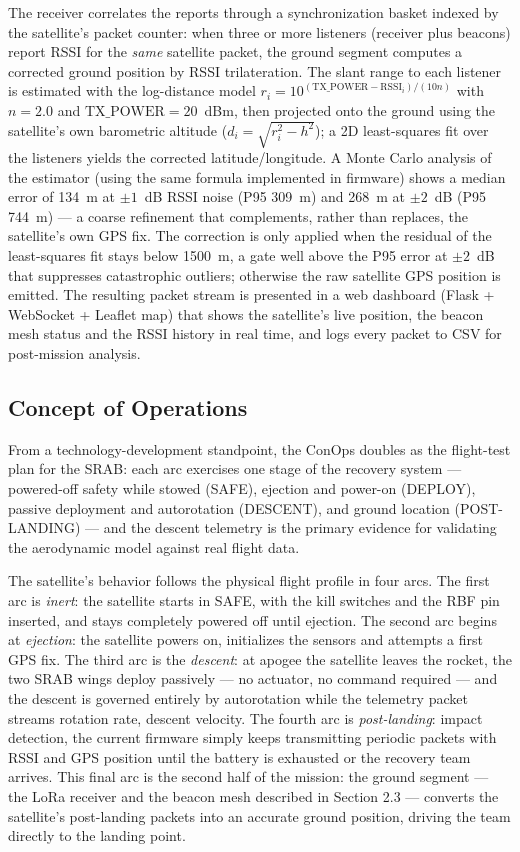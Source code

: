 The receiver correlates the reports through a synchronization basket
indexed by the satellite's packet counter: when three or more
listeners (receiver plus beacons) report RSSI for the \emph{same}
satellite packet, the ground segment computes a corrected ground
position by RSSI trilateration. The slant range to each listener is
estimated with the log-distance model
$r_i = 10^{(\mathrm{TX\_POWER} - \mathrm{RSSI}_i)/(10 n)}$ with
$n = 2.0$ and $\mathrm{TX\_POWER} = 20$~dBm, then projected onto the
ground using the satellite's own barometric altitude
($d_i = \sqrt{r_i^2 - h^2}$); a 2D least-squares fit over the
listeners yields the corrected latitude/longitude. A Monte Carlo
analysis of the estimator (using the same formula implemented in
firmware) shows a median error of 134~m at $\pm1$~dB RSSI noise (P95
309~m) and 268~m at $\pm2$~dB (P95 744~m) --- a coarse refinement
that complements, rather than replaces, the satellite's own GPS fix.
The correction is only applied when the residual of the least-squares
fit stays below 1500~m, a gate well above the P95 error at $\pm2$~dB
that suppresses catastrophic outliers; otherwise the raw satellite GPS
position is emitted. The resulting packet stream is presented in a web
dashboard (Flask + WebSocket + Leaflet map) that shows the satellite's
live position, the beacon mesh status and the RSSI history in real
time, and logs every packet to CSV for post-mission analysis.

\subsection{Concept of Operations}

From a technology-development standpoint, the ConOps doubles as the
flight-test plan for the SRAB: each arc exercises one stage of the
recovery system --- powered-off safety while stowed (SAFE), ejection
and power-on (DEPLOY), passive deployment and autorotation (DESCENT),
and ground location (POST-LANDING) --- and the descent telemetry is
the primary evidence for validating the aerodynamic model against
real flight data.

The satellite's behavior follows the physical flight profile in four
arcs. The first arc is \emph{inert}: the satellite starts in SAFE, with the kill switches and
the RBF pin inserted, and stays completely powered off until ejection.
The second arc begins at \emph{ejection}: the satellite powers on,
initializes the sensors and attempts a first GPS fix. 
The third arc is the \emph{descent}: at apogee the
satellite leaves the rocket, the two SRAB wings deploy passively ---
no actuator, no command required --- and the descent is governed
entirely by autorotation while the telemetry packet streams
rotation rate, descent velocity. The fourth arc is \emph{post-landing}: impact
detection, the current firmware simply keeps
transmitting periodic packets with RSSI and GPS position until the
battery is exhausted or the recovery team arrives. This final arc is
the second half of the mission: the ground segment --- the LoRa
receiver and the beacon mesh described in Section 2.3 --- converts the
satellite's post-landing packets into an accurate ground position,
driving the team directly to the landing point.

